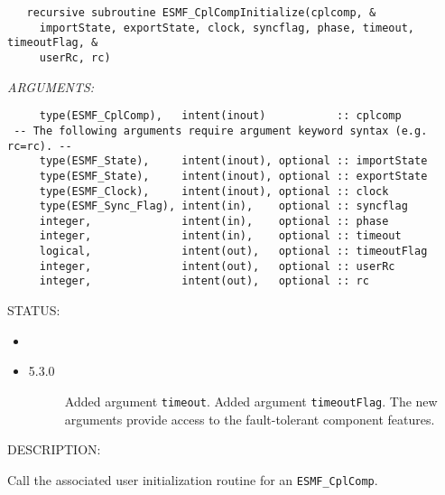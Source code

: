   
\begin{verbatim}   recursive subroutine ESMF_CplCompInitialize(cplcomp, &
     importState, exportState, clock, syncflag, phase, timeout, timeoutFlag, &
     userRc, rc)\end{verbatim}{\em ARGUMENTS:}
\begin{verbatim}     type(ESMF_CplComp),   intent(inout)           :: cplcomp
 -- The following arguments require argument keyword syntax (e.g. rc=rc). --
     type(ESMF_State),     intent(inout), optional :: importState
     type(ESMF_State),     intent(inout), optional :: exportState
     type(ESMF_Clock),     intent(inout), optional :: clock
     type(ESMF_Sync_Flag), intent(in),    optional :: syncflag
     integer,              intent(in),    optional :: phase
     integer,              intent(in),    optional :: timeout
     logical,              intent(out),   optional :: timeoutFlag
     integer,              intent(out),   optional :: userRc
     integer,              intent(out),   optional :: rc\end{verbatim}
{\sf STATUS:}
   \begin{itemize}
   \item{}
   \item{}
   \begin{description}
   \item[5.3.0] Added argument {\tt timeout}.
                Added argument {\tt timeoutFlag}.
                The new arguments provide access to the fault-tolerant component
                features.
   \end{description}
   \end{itemize}
  
{\sf DESCRIPTION:\\ }


   Call the associated user initialization routine for
   an {\tt ESMF\_CplComp}.
  
